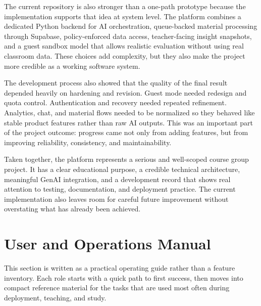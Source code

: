 \documentclass[11pt,a4paper]{article}
\begin{document}
The current repository is also stronger than a one-path prototype because the implementation
supports that idea at system level. The platform combines a dedicated Python backend for AI
orchestration, queue-backed material processing through Supabase, policy-enforced data access,
teacher-facing insight snapshots, and a guest sandbox model that allows realistic evaluation without
using real classroom data. These choices add complexity, but they also make the project more
credible as a working software system.

The development process also showed that the quality of the final result depended heavily on
hardening and revision. Guest mode needed redesign and quota control. Authentication and recovery
needed repeated refinement. Analytics, chat, and material flows needed to be normalized so they
behaved like stable product features rather than raw AI outputs. This was an important part of the
project outcome: progress came not only from adding features, but from improving reliability,
consistency, and maintainability.

Taken together, the platform represents a serious and well-scoped course group project. It has a
clear educational purpose, a credible technical architecture, meaningful GenAI integration, and a
development record that shows real attention to testing, documentation, and deployment practice.
The current implementation also leaves room for careful future improvement without overstating what
has already been achieved.

\newpage
\section{User and Operations Manual}

\noindent This section is written as a practical operating guide rather than a feature inventory. Each role
starts with a quick path to first success, then moves into compact reference material for the tasks
that are used most often during deployment, teaching, and study.
\end{document}
